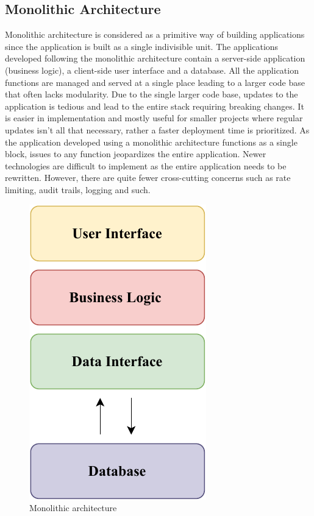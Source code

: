 \documentclass{home_assignment}
\begin{document}
    \subsection{Monolithic Architecture}
    Monolithic architecture is considered as a primitive way of building applications since the application is built as a single indivisible unit. The applications developed following the monolithic architecture contain a server-side application (business logic), a client-side user interface and a database. All the application functions are managed and served at a single place leading to a larger code base that often lacks modularity. Due to the single larger code base, updates to the application is tedious and lead to the entire stack requiring breaking changes. It is easier in implementation and mostly useful for smaller projects where regular updates isn't all that necessary, rather a faster deployment time is prioritized. As the application developed using a monolithic architecture functions as a single block, issues to any function jeopardizes the entire application. Newer technologies are difficult to implement as the entire application needs to be rewritten. However, there are quite fewer cross-cutting concerns such as rate limiting, audit trails, logging and such. 
\begin{figure}[H]
    \centering
    \includegraphics{../Figures/Monolith.pdf}
    \caption{Monolithic architecture}
    \label{fig:mono}
\end{figure}
\end{document}
